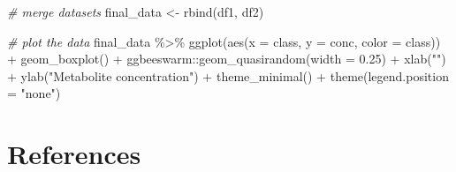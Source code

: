 \documentclass[smallextended]{svjour3}       %
\newenvironment{Shaded}{\begin{snugshade}}{\end{snugshade}}
\newcommand{\AttributeTok}[1]{\textcolor[rgb]{0.77,0.63,0.00}{#1}}
\newcommand{\CommentTok}[1]{\textcolor[rgb]{0.56,0.35,0.01}{\textit{#1}}}
\newcommand{\FloatTok}[1]{\textcolor[rgb]{0.00,0.00,0.81}{#1}}
\newcommand{\FunctionTok}[1]{\textcolor[rgb]{0.00,0.00,0.00}{#1}}
\newcommand{\NormalTok}[1]{#1}
\newcommand{\OtherTok}[1]{\textcolor[rgb]{0.56,0.35,0.01}{#1}}
\newcommand{\SpecialCharTok}[1]{\textcolor[rgb]{0.00,0.00,0.00}{#1}}
\newcommand{\StringTok}[1]{\textcolor[rgb]{0.31,0.60,0.02}{#1}}
\begin{document}
\begin{Shaded}
\begin{Highlighting}[]
\CommentTok{\# merge datasets}
\NormalTok{final\_data }\OtherTok{\textless{}{-}} \FunctionTok{rbind}\NormalTok{(df1, df2)}
\end{Highlighting}
\end{Shaded}

\begin{Shaded}
\begin{Highlighting}[]
\CommentTok{\# plot the data}
\NormalTok{final\_data }\SpecialCharTok{\%\textgreater{}\%} 
  \FunctionTok{ggplot}\NormalTok{(}\FunctionTok{aes}\NormalTok{(}\AttributeTok{x =}\NormalTok{ class, }\AttributeTok{y =}\NormalTok{ conc, }\AttributeTok{color =}\NormalTok{ class)) }\SpecialCharTok{+}
  \FunctionTok{geom\_boxplot}\NormalTok{() }\SpecialCharTok{+}
\NormalTok{  ggbeeswarm}\SpecialCharTok{::}\FunctionTok{geom\_quasirandom}\NormalTok{(}\AttributeTok{width =} \FloatTok{0.25}\NormalTok{) }\SpecialCharTok{+} 
  \FunctionTok{xlab}\NormalTok{(}\StringTok{""}\NormalTok{) }\SpecialCharTok{+}
  \FunctionTok{ylab}\NormalTok{(}\StringTok{"Metabolite concentration"}\NormalTok{) }\SpecialCharTok{+} 
  \FunctionTok{theme\_minimal}\NormalTok{() }\SpecialCharTok{+}
  \FunctionTok{theme}\NormalTok{(}\AttributeTok{legend.position =} \StringTok{"none"}\NormalTok{)}
\end{Highlighting}
\end{Shaded}

\hypertarget{references}{%
\section*{References}\label{references}}
\end{document}
